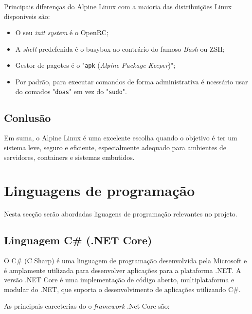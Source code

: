 Principais diferenças do Alpine Linux com a maioria das distribuições Linux disponiveis são:
\begin{itemize}
    \item O seu \textit{init system} é o OpenRC;
    \item A \textit{shell} predefenida é o busybox ao contrário do famoso \textit{Bash} ou ZSH;
    \item Gestor de pagotes é o "\texttt{apk} (\textit{Alpine Package Keeper})";
    \item Por padrão, para executar comandos de forma administrativa é ncessário usar do comados "\texttt{doas}" em vez do "\texttt{sudo}".
\end{itemize} 

\subsection{Conlusão}

Em suma, o Alpine Linux é uma excelente escolha quando o objetivo é ter um sistema 
leve, seguro e eficiente, especialmente adequado para ambientes de servidores, containers
e sistemas embutidos.


\section{Linguagens de programação}

Nesta secção serão abordadas liguagens de programação relevantes no projeto.

\subsection{Linguagem C\# (.NET Core)}

O C\# (C Sharp) é uma linguagem de programação desenvolvida pela Microsoft e é amplamente
utilizada para desenvolver aplicações para a plataforma .NET. A versão .NET Core 
é uma implementação de código aberto, multiplataforma e modular do .NET,
que suporta o desenvolvimento de aplicações utilizando C\#.

As principais carecterias do o \textit{framework} .Net Core são:

